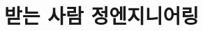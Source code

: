 \documentclass[aspectratio=1610,12pt,xcolor=pdftex,dvipsnames,table,handout]{beamer}
\begin{document}
%	
%
%
%
%
%
%


		\section{받는 사람 정엔지니어링}
	
\end{document}
